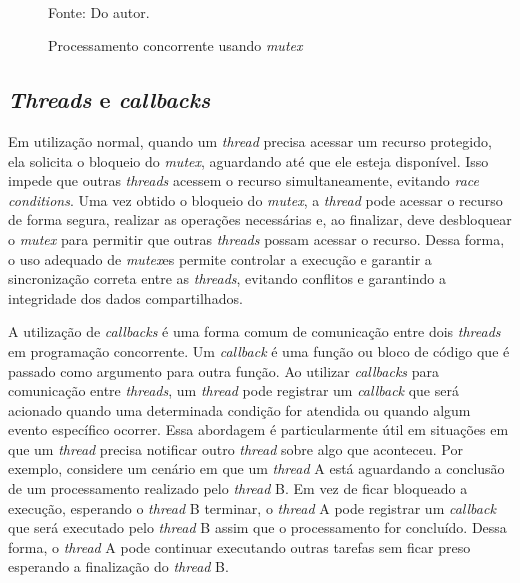 \begin{figure}[ht]
	\centering
	\caption{Processamento concorrente usando \textit{mutex}}
	\\
	\label{fig:mutex}
	\footnotesize{Fonte: Do autor.}
\end{figure}

\subsection{\textit{Threads} e \textit{callbacks}}

Em utilização normal, quando um \textit{thread} precisa acessar um recurso protegido, ela solicita o bloqueio do \textit{mutex}, aguardando até que ele esteja disponível. Isso impede que outras \textit{threads} acessem o recurso simultaneamente, evitando \textit{race conditions}. Uma vez obtido o bloqueio do \textit{mutex}, a \textit{thread} pode acessar o recurso de forma segura, realizar as operações necessárias e, ao finalizar, deve desbloquear o \textit{mutex} para permitir que outras \textit{threads} possam acessar o recurso. Dessa forma, o uso adequado de \textit{mutex}es permite controlar a execução e garantir a sincronização correta entre as \textit{threads}, evitando conflitos e garantindo a integridade dos dados compartilhados.

A utilização de \textit{callbacks} é uma forma comum de comunicação entre dois \textit{threads} em programação concorrente. Um \textit{callback} é uma função ou bloco de código que é passado como argumento para outra função. Ao utilizar \textit{callbacks} para comunicação entre \textit{threads}, um \textit{thread} pode registrar um \textit{callback} que será acionado quando uma determinada condição for atendida ou quando algum evento específico ocorrer. Essa abordagem é particularmente útil em situações em que um \textit{thread} precisa notificar outro \textit{thread} sobre algo que aconteceu. Por exemplo, considere um cenário em que um \textit{thread} A está aguardando a conclusão de um processamento realizado pelo \textit{thread} B. Em vez de ficar bloqueado a execução, esperando o \textit{thread} B terminar, o \textit{thread} A pode registrar um \textit{callback} que será executado pelo \textit{thread} B assim que o processamento for concluído. Dessa forma, o \textit{thread} A pode continuar executando outras tarefas sem ficar preso esperando a finalização do \textit{thread} B.

